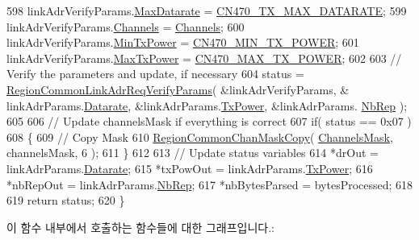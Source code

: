 \begin{DoxyCode}
598     linkAdrVerifyParams.\mbox{\hyperlink{structs_region_common_link_adr_req_verify_params_af426381985228a55dc22b90441f49c4c}{MaxDatarate}} = \mbox{\hyperlink{group___r_e_g_i_o_n_c_n470_ga6124e3e1f145254943806b46c8844c1e}{CN470\_TX\_MAX\_DATARATE}};
599     linkAdrVerifyParams.\mbox{\hyperlink{structs_region_common_link_adr_req_verify_params_afecbd1e457cbd79eb7072bd140ff33d4}{Channels}} = \mbox{\hyperlink{_region_c_n470_8c_a23b07a348a0f1b8a5bc01990710126c1}{Channels}};
600     linkAdrVerifyParams.\mbox{\hyperlink{structs_region_common_link_adr_req_verify_params_afe7bf10e9fadd8be6beb31e8b91a1ba2}{MinTxPower}} = \mbox{\hyperlink{group___r_e_g_i_o_n_c_n470_ga706088a08c37b56b67e88d8afa9a1db8}{CN470\_MIN\_TX\_POWER}};
601     linkAdrVerifyParams.\mbox{\hyperlink{structs_region_common_link_adr_req_verify_params_a118829b26fb7d913d4202d5d06356a95}{MaxTxPower}} = \mbox{\hyperlink{group___r_e_g_i_o_n_c_n470_gae977eb62cc9b2f49770b5f0d5ec1e5df}{CN470\_MAX\_TX\_POWER}};
602 
603     \textcolor{comment}{// Verify the parameters and update, if necessary}
604     status = \mbox{\hyperlink{group___r_e_g_i_o_n_c_o_m_m_o_n_ga2c87f98f09793dc7fa63a9801feeed73}{RegionCommonLinkAdrReqVerifyParams}}( &linkAdrVerifyParams, &
      linkAdrParams.\mbox{\hyperlink{structs_region_common_link_adr_params_ae2f6080f3aa0e9485c55513ca56bb24d}{Datarate}}, &linkAdrParams.\mbox{\hyperlink{structs_region_common_link_adr_params_a037b4f849fa8ed4aa1d3c58aef2b28ec}{TxPower}}, &linkAdrParams.
      \mbox{\hyperlink{structs_region_common_link_adr_params_a3b99538671d86dbfe2f6754ce6f9577a}{NbRep}} );
605 
606     \textcolor{comment}{// Update channelsMask if everything is correct}
607     \textcolor{keywordflow}{if}( status == 0x07 )
608     \{
609         \textcolor{comment}{// Copy Mask}
610         \mbox{\hyperlink{group___r_e_g_i_o_n_c_o_m_m_o_n_ga95f5199d490113269fae7f2e0569e9a0}{RegionCommonChanMaskCopy}}( \mbox{\hyperlink{_region_c_n470_8c_a2188957b5ca6af8092154d7ccbfa5757}{ChannelsMask}}, channelsMask, 6 );
611     \}
612 
613     \textcolor{comment}{// Update status variables}
614     *drOut = linkAdrParams.\mbox{\hyperlink{structs_region_common_link_adr_params_ae2f6080f3aa0e9485c55513ca56bb24d}{Datarate}};
615     *txPowOut = linkAdrParams.\mbox{\hyperlink{structs_region_common_link_adr_params_a037b4f849fa8ed4aa1d3c58aef2b28ec}{TxPower}};
616     *nbRepOut = linkAdrParams.\mbox{\hyperlink{structs_region_common_link_adr_params_a3b99538671d86dbfe2f6754ce6f9577a}{NbRep}};
617     *nbBytesParsed = bytesProcessed;
618 
619     \textcolor{keywordflow}{return} status;
620 \}
\end{DoxyCode}
이 함수 내부에서 호출하는 함수들에 대한 그래프입니다.\+:
\mbox{\label{group___r_e_g_i_o_n_c_n470_ga3db01af8efb6f0c07db00b78dcb2ebfe}} 
